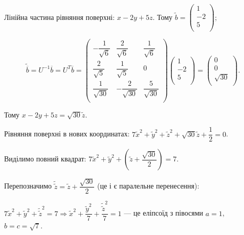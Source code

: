 Лінійна частина рівняння поверхні: $x - 2y +5z$. Тому $\tilde{b} = \begin{pmatrix}
	1 \\
	-2 \\
	5 \\
\end{pmatrix}$;

$$\tilde{\overline{b}} = U^{-1} \overline{b} = U^T \overline{b} = \begin{pmatrix}
	-\dfrac{1}{\sqrt{6}} & \dfrac{2}{\sqrt{6}}   & \dfrac{1}{\sqrt{6}} \\
	\dfrac{2}{\sqrt{5}}  & \dfrac{1}{\sqrt{5}}   & 0 \\
	\dfrac{1}{\sqrt{30}} & -\dfrac{2}{\sqrt{30}} & \dfrac{5}{\sqrt{30}} \\
\end{pmatrix} \begin{pmatrix}
	1 \\
	-2 \\
	5 \\
\end{pmatrix} = \begin{pmatrix}
	0 \\
	0 \\
	\sqrt{30} \\
\end{pmatrix}.$$

Тому $x - 2y + 5z = \sqrt{30}\tilde{z}$.

Рівняння поверхні в нових координатах: $7\tilde{x}^2 + \tilde{y}^2 + \tilde{z}^2 + \sqrt{30} \tilde{z} + \dfrac{1}{2} = 0$.

Виділимо повний квадрат: $7\tilde{x}^2 + \tilde{y}^2 + \left( \tilde{z} + \dfrac{\sqrt{30}}{2} \right) = 7$.

Перепозначимо $\tilde{\tilde{z}} = \tilde{z} + \dfrac{\sqrt{30}}{2}$ (це і є паралельне перенесення): 

$7\tilde{x}^2 + \tilde{y}^2 + \tilde{\tilde{z}}^2
= 7 \Rightarrow \tilde{x}^2 + \dfrac{\tilde{y}^2}{7} + \dfrac{\tilde{\tilde{z}}^2}{7} = 1$
--- це еліпсоїд з півосями $a = 1$, $b = c = \sqrt{7}$.


